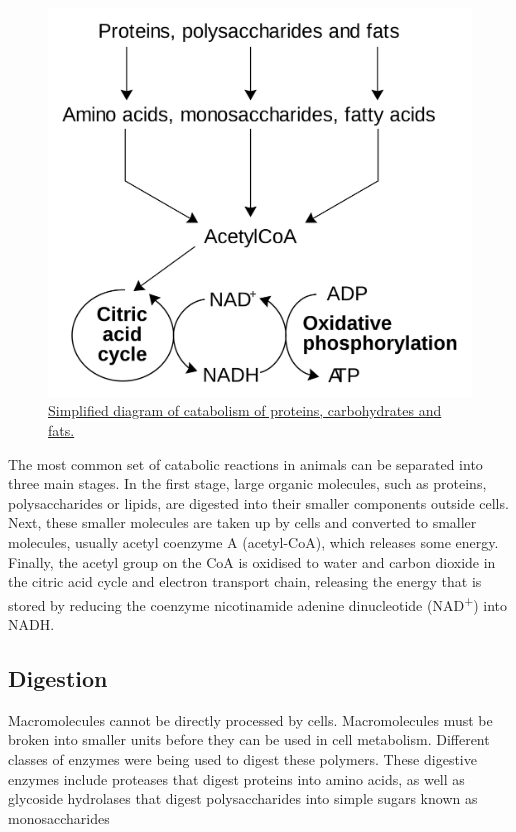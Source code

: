 \begin{figure}

{\centering \includegraphics[width=0.7\linewidth]{./figures/bioenergetics/Catabolism_schematic} 

}

\caption{\href{https://commons.wikimedia.org/wiki/File:Catabolism_schematic.svg}{Simplified diagram of catabolism of proteins, carbohydrates and fats.}}\label{fig:simplecatdia}
\end{figure}

The most common set of catabolic reactions in animals can be separated into three main stages. In the first stage, large organic molecules, such as proteins, polysaccharides or lipids, are digested into their smaller components outside cells. Next, these smaller molecules are taken up by cells and converted to smaller molecules, usually acetyl coenzyme A (acetyl-CoA), which releases some energy. Finally, the acetyl group on the CoA is oxidised to water and carbon dioxide in the citric acid cycle and electron transport chain, releasing the energy that is stored by reducing the coenzyme nicotinamide adenine dinucleotide (NAD\textsuperscript{+}) into NADH.

\hypertarget{digestion}{%
\subsection{Digestion}\label{digestion}}

Macromolecules cannot be directly processed by cells. Macromolecules must be broken into smaller units before they can be used in cell metabolism. Different classes of enzymes were being used to digest these polymers. These digestive enzymes include proteases that digest proteins into amino acids, as well as glycoside hydrolases that digest polysaccharides into simple sugars known as monosaccharides

